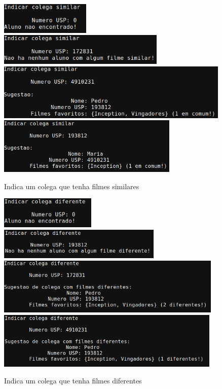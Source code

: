 \documentclass[12pt,a4paper,portuguese]{article}
\begin{document}
        \begin{figure}[H]
            \centering
            \includegraphics[height=1.5cm]{imgs/indica_similar_1.png}
            \includegraphics[height=1.5cm]{imgs/indica_similar_2.png}
            \includegraphics[height=2.7cm]{imgs/indica_similar_3.png}
            \includegraphics[height=2.7cm]{imgs/indica_similar_4.png}
            \caption{Indica um colega que tenha filmes similares}
        \end{figure}

        \begin{figure}[H]
            \centering
            \includegraphics[height=1.5cm]{imgs/indica_diferente_1.png}
            \includegraphics[height=1.5cm]{imgs/indica_diferente_3.png}
            \includegraphics[height=2.7cm]{imgs/indica_diferente_2.png}
            \includegraphics[height=2.7cm]{imgs/indica_diferente_4.png}
            \caption{Indica um colega que tenha filmes diferentes}
        \end{figure}
\end{document}
